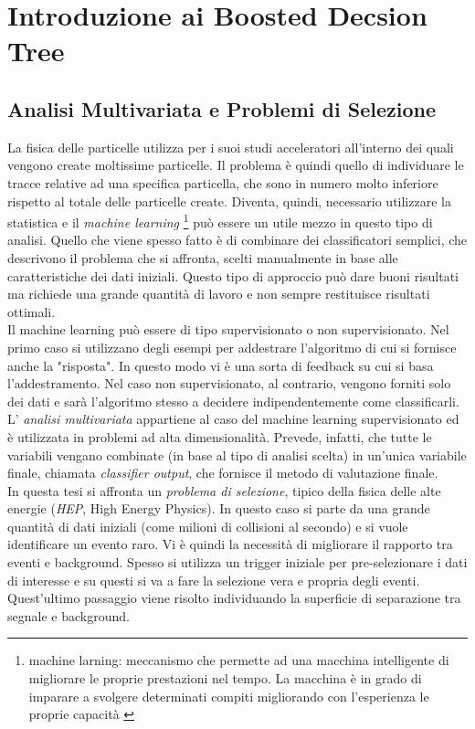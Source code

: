 \chapter{Introduzione ai Boosted Decsion Tree}

\section{Analisi Multivariata e Problemi di Selezione} \label{AnalisiMulti}
La fisica delle particelle utilizza per i suoi studi acceleratori all'interno dei quali vengono create moltissime particelle. Il problema è quindi quello di individuare le tracce relative ad una specifica particella, che sono in numero molto inferiore rispetto al totale delle particelle create. Diventa, quindi, necessario utilizzare la statistica e il \textit{machine learning} \footnote{machine larning: meccanismo che permette ad una macchina intelligente di migliorare le proprie prestazioni nel tempo. La macchina è in grado di imparare a svolgere determinati compiti migliorando con l'esperienza le proprie capacità \cite{sitoMachineLearning}} può essere un utile mezzo in questo tipo di analisi. Quello che viene spesso fatto è di combinare dei classificatori semplici, che descrivono il problema che si affronta, scelti manualmente in base alle caratteristiche dei dati iniziali. Questo tipo di approccio può dare buoni risultati ma richiede una grande quantità di lavoro e non sempre restituisce risultati ottimali.\cite{articoloDeepLearning} 
\\Il machine learning può essere di tipo supervisionato o non supervisionato. Nel primo caso si utilizzano degli esempi per addestrare l'algoritmo di cui si fornisce anche la "risposta". In questo modo vi è una sorta di feedback su cui si basa l'addestramento. Nel caso non supervisionato, al contrario, vengono forniti solo dei dati e sarà l'algoritmo stesso a decidere indipendentemente come classificarli. L' \textit{analisi multivariata}  appartiene al caso del machine learning supervisionato ed è utilizzata in problemi ad alta dimensionalità. Prevede, infatti, che tutte le variabili vengano combinate (in base al tipo di analisi scelta) in un'unica variabile finale, chiamata \textit{classifier output}, che fornisce il metodo di valutazione finale.
\\In questa tesi si affronta un \textit{problema di selezione}, tipico della fisica delle alte energie (\textit{HEP}, High Energy Physics). In questo caso si parte da una grande quantità di dati iniziali (come milioni di collisioni al secondo) e si vuole identificare un evento raro. Vi è quindi la necessità di migliorare il rapporto tra eventi e background. Spesso si utilizza un trigger iniziale per pre-selezionare i dati di interesse e su questi si va a fare la selezione vera e propria degli eventi. Quest'ultimo passaggio viene risolto individuando la superficie di separazione tra segnale e background. 


